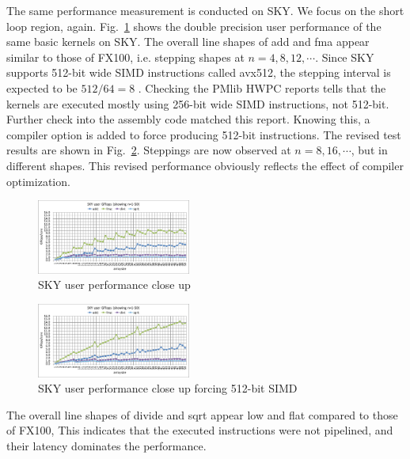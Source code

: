 \documentclass[conference]{IEEEtran}
\begin{document}
The same performance measurement is conducted on SKY.
We focus on the short loop region, again.
Fig.~\ref{fig:sky-user-short-R8}
shows the double precision user performance of the same basic kernels on SKY.
The overall line shapes of add and fma appear similar to those of FX100,
i.e.  stepping shapes at $ n=4,8,12,\cdots $.
Since SKY supports 512-bit wide SIMD instructions called avx512,
the stepping interval is expected to be
\begin{math}
512 / 64 = 8
\end{math}
.
Checking the PMlib HWPC reports tells that the kernels are executed
mostly using 256-bit wide SIMD instructions, not 512-bit.
Further check into the assembly code matched this report.
Knowing this, a compiler option is added to force producing 512-bit instructions.
The revised test results are shown in
Fig.~\ref{fig:sky-user-short-R8-avx512}.
Steppings are now observed at $ n=8,16,\cdots $, but in different shapes.
This revised performance obviously reflects the effect of compiler optimization.
%
\begin{figure}[tb]
\centering
\includegraphics[width=0.45\textwidth]{figs/sky-user-short-R8.pdf}
\caption{SKY user performance close up}
\label{fig:sky-user-short-R8}
\end{figure}
%
\begin{figure}[tb]
\centering
\includegraphics[width=0.45\textwidth]{figs/sky-user-short-R8-avx512.pdf}
\caption{SKY user performance close up forcing 512-bit SIMD}
\label{fig:sky-user-short-R8-avx512}
\end{figure}

The overall line shapes of divide and sqrt appear low and flat compared
to those of FX100,
This indicates that the executed instructions were not pipelined,
and their latency dominates the performance.
\end{document}
